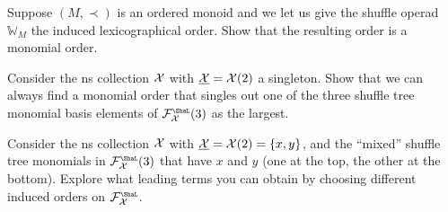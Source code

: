 \begin{question}\label{ex:orderedM}
Suppose $(M,\prec)$ is an ordered monoid and
we let us give the shuffle operad
$\mathbb{W}_M$ the induced lexicographical 
order. Show that the resulting order is a monomial
order.
\end{question}

\begin{question}
Consider the ns collection $\mathcal{X}$ with $\underline{\mathcal{X}} = \mathcal{X}(2)$
a singleton. Show that we can always find a monomial order that
singles out one of the three shuffle tree monomial basis
elements of $\FF_\XX^\Sha(3)$ as the largest. 
\end{question}

\begin{question}
Consider the ns collection $\mathcal{X}$ with $\underline{\mathcal{X}} = \mathcal{X}(2)
= \{x,y\}$, and the ``mixed'' shuffle tree monomials in 
$\FF_\XX^\Sha(3)$ that have $x$ and $y$ (one at the top,
the other at the bottom). Explore what leading terms
you can obtain by choosing different induced orders
on $\FF_\XX^\Sha$.
\end{question}